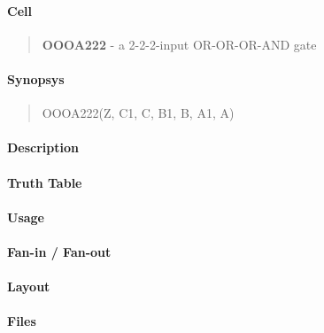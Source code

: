 \label{OOOA222}
\paragraph{Cell}
\begin{quote}
    \textbf{OOOA222} - a 2-2-2-input OR-OR-OR-AND gate
\end{quote}

\paragraph{Synopsys}
\begin{quote}
    OOOA222(Z, C1, C, B1, B, A1, A)
\end{quote}

\paragraph{Description}

%

\paragraph{Truth Table}
%

\paragraph{Usage}

\paragraph{Fan-in / Fan-out}

\paragraph{Layout}

\paragraph{Files}
